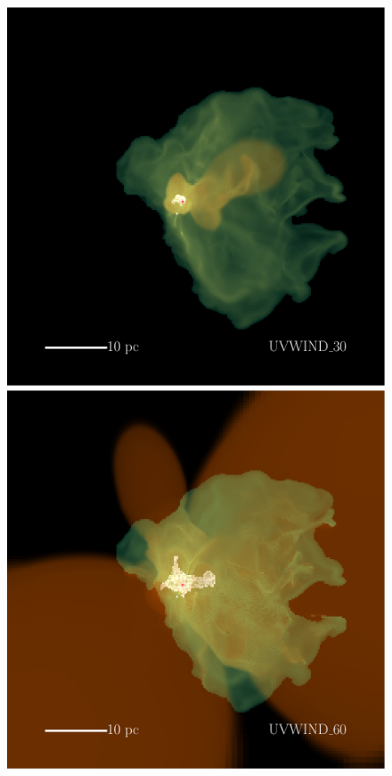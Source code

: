 \documentclass[a4paper,fleqn,usenatbib]{mnras}
\begin{document}
\begin{figure}
	\includegraphics[width=1\columnwidth]{plots/fig12a.pdf} \includegraphics[width=1\columnwidth]{plots/fig12b.pdf}

\end{figure}
\end{document}
